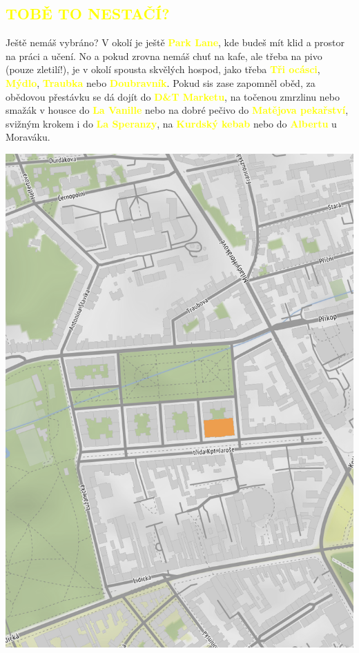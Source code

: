 \documentclass[a5paper, twoside]{article}
\newcommand{\podnadpis}[2]{
  \subsection*{\textcolor{#2}{#1}}
}
\begin{document}
\podnadpis{TOBĚ TO NESTAČÍ?}{yellow}
Ještě nemáš vybráno? V okolí je ještě \textcolor{yellow}{\textbf{Park Lane}}, kde budeš mít klid a prostor na práci a učení. No a pokud zrovna nemáš chuť na kafe, ale třeba na pivo (pouze zletilí!), je v okolí spousta skvělých hospod, jako třeba \textcolor{yellow}{\textbf{Tři ocásci}}, \textcolor{yellow}{\textbf{Mýdlo}}, \textcolor{yellow}{\textbf{Traubka}} nebo \textcolor{yellow}{\textbf{Doubravník}}. Pokud sis zase zapomněl oběd, za obědovou přestávku se dá dojít do \textcolor{yellow}{\textbf{D\&T Marketu}}, na točenou zmrzlinu nebo smažák v housce do \textcolor{yellow}{\textbf{La Vanille}} nebo na dobré pečivo do \textcolor{yellow}{\textbf{Matějova pekařství}}, svižným krokem i do \textcolor{yellow}{\textbf{La Speranzy}}, na \textcolor{yellow}{\textbf{Kurdský kebab}} nebo do \textcolor{yellow}{\textbf{Albertu}} u Moraváku.

\pagebreak

\noindent\includegraphics[width=\paperwidth]{mapa.png}
\restoregeometry
\pagebreak
\end{document}
